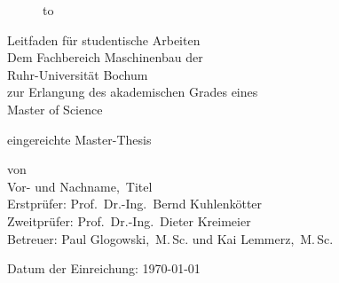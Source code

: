 
\begin{titlepage}	
	\begin{center}			
		\begin{figure}			
			\vspace{-0.7cm}
			\begin{center}
				\hbox to 
			\end{center}
			\vspace{2.5cm}
		\end{figure}			
					
			
		\Huge			
		Leitfaden für studentische Arbeiten \\ %
		\vspace{1.5cm}
		\large
		Dem Fachbereich Maschinenbau der \\
		Ruhr-Universität Bochum \\
		zur Erlangung des akademischen Grades eines \\
		Master of Science
		
		\vspace{1cm}
		eingereichte Master-Thesis
		
		\vspace{1cm}
		von\\
		Vor- und Nachname,~Titel \\

		\vspace{1.5cm}
		Erstprüfer: Prof.~Dr.-Ing.~Bernd Kuhlenkötter \\
		Zweitprüfer: Prof.~Dr.-Ing.~Dieter Kreimeier \\
		Betreuer: Paul Glogowski,~M.\,Sc. und Kai Lemmerz,~M.\,Sc.

		\vspace{1cm}
		Datum der Einreichung: \today
	\end{center}
\end{titlepage}
